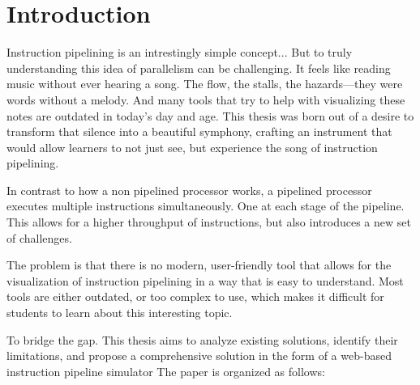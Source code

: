 \chapter{Introduction}


Instruction pipelining is an intrestingly simple concept... But to truly understanding this idea of parallelism can be challenging. It feels like reading music without ever hearing a song. The flow, the stalls, the hazards—they were words without a melody. And many tools that try to help with visualizing these notes are outdated in today's day and age.
This thesis was born out of a desire to transform that silence into a beautiful symphony, crafting an instrument that would allow learners to not just see, but experience the song of instruction pipelining.

In contrast to how a non pipelined processor works, a pipelined processor executes multiple instructions simultaneously. One at each stage of the pipeline. This allows for a higher throughput of instructions, but also introduces a new set of challenges.

The problem is that there is no modern, user-friendly tool that allows for the visualization of instruction pipelining in a way that is easy to understand. Most tools are either outdated, or too complex to use, which makes it difficult for students to learn about this interesting topic.

To bridge the gap. This thesis aims to analyze existing solutions, identify their limitations, and propose a comprehensive solution in the form of a web-based instruction pipeline simulator
The paper is organized as follows: 
